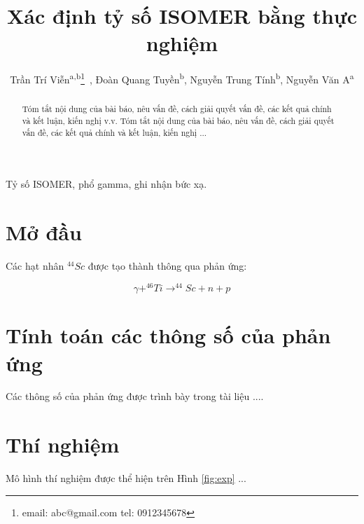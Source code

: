 \documentclass[11pt, a4paper, journal]{paper}
\begin{document}
\title{Xác định tỷ số ISOMER bằng thực nghiệm}
\author{Trần Trí Viễn\textsuperscript{a,b}\thanks{email: abc@gmail.com \newline tel: 0912345678}~,
	Đoàn Quang Tuyền\textsuperscript{b}, 
	Nguyễn Trung Tính\textsuperscript{b}, 
	Nguyễn Văn A\textsuperscript{a}
}


\maketitle

\begin{abstract}
Tóm tắt nội dung của bài báo, nêu vấn đề, cách giải quyết vấn đề, các kết quả chính và kết luận, kiến nghị v.v. Tóm tắt nội dung của bài báo, nêu vấn đề, cách giải quyết vấn đề, các kết quả chính và kết luận, kiến nghị ... 
\end{abstract}

\begin{keywords}
Tỷ số ISOMER, phổ gamma, ghi nhận bức xạ.
\end{keywords}

\section{Mở đầu}
Các hạt nhân $^{44}Sc$ được tạo thành thông qua phản ứng:

\begin{equation}
\gamma + ^{46}Ti \rightarrow ^{44}Sc + n + p
\end{equation}



\section{Tính toán các thông số của phản ứng}
Các thông số của phản ứng được trình bày trong tài liệu \cite{bib_boston1997, bib_Klein, bib_Knoll} ....




\section{Thí nghiệm}
Mô hình thí nghiệm được thể hiện trên Hình \ref{fig:exp} ...
\end{document}
